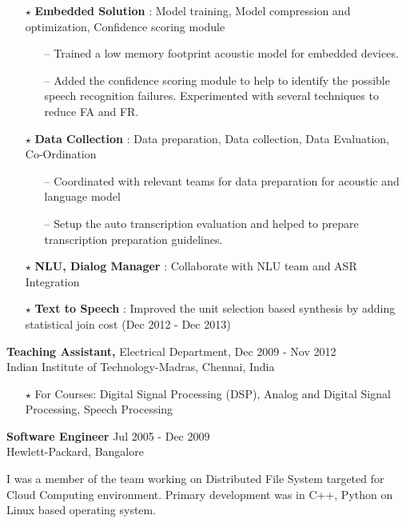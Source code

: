 \documentclass[line,margin]{res}
\begin{document}
\begin{resume}
\begin{itemize}
	\item[$\star$] {\bf Embedded Solution}   : Model training, Model compression and optimization, Confidence scoring module
	\begin{itemize}	\small	
		\item[--] Trained a low memory footprint acoustic model for embedded devices.
		\item[--] Added the confidence scoring module to help to identify the possible speech recognition failures. Experimented with several techniques to reduce FA and FR.
	\end{itemize}

	\item[$\star$] {\bf Data Collection}     : Data preparation, Data collection, Data Evaluation, Co-Ordination
	\begin{itemize}	\small	
		\item[--] Coordinated with relevant teams for data preparation for acoustic and language model
		\item[--] Setup the auto transcription evaluation and helped to prepare transcription preparation guidelines.
	\end{itemize}

	\item[$\star$] {\bf NLU, Dialog Manager} : Collaborate with NLU team and ASR Integration
	\item[$\star$] {\bf Text to Speech}      : Improved the unit selection based synthesis by adding statistical join cost (Dec 2012 - Dec 2013)
\end{itemize}

\normalsize
  {\bf Teaching Assistant,} Electrical Department, \hfill Dec 2009 - Nov 2012\\
 \hfill Indian Institute of Technology-Madras, Chennai, India
 
\begin{itemize} \itemsep -2pt  %
\small
	\item[$\star$] For Courses: Digital Signal Processing (DSP), Analog and Digital Signal Processing, Speech Processing
\end{itemize}

\normalsize
 {\bf Software Engineer} \hfill Jul 2005 - Dec 2009\\
 \hfill Hewlett-Packard, Bangalore

\small
I was a member of the team working on Distributed File System targeted for Cloud Computing environment. Primary development was in C++, Python on Linux based operating system.
 

\end{resume}
\end{document}
